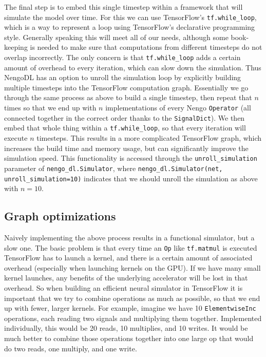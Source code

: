 \documentclass{article}
\begin{document}
The final step is to embed this single timestep within a framework that will simulate the model over time.  For this we can use TensorFlow's \texttt{tf.while\_loop}, which is a way to represent a loop using TensorFlow's declarative programming style.  Generally speaking this will meet all of our needs, although some book-keeping is needed to make sure that computations from different timesteps do not overlap incorrectly.  The only concern is that \texttt{tf.while\_loop} adds a certain amount of overhead to every iteration, which can slow down the simulation.  Thus NengoDL has an option to unroll the simulation loop by explicitly building multiple timesteps into the TensorFlow computation graph.  Essentially we go through the same process as above to build a single timestep, then repeat that $n$ times so that we end up with $n$ implementations of every Nengo \texttt{Operator} (all connected together in the correct order thanks to the \texttt{SignalDict}).  We then embed that whole thing within a \texttt{tf.while\_loop}, so that every iteration will execute $n$ timesteps.  This results in a more complicated TensorFlow graph, which increases the build time and memory usage, but can significantly improve the simulation speed.  This functionality is accessed through the \texttt{unroll\_simulation} parameter of \texttt{nengo\_dl.Simulator}, where \texttt{nengo\_dl.Simulator(net, unroll\_simulation=10)} indicates that we should unroll the simulation as above with $n=10$.

\subsection{Graph optimizations}
\label{sec:graphoptimizations}

Naively implementing the above process results in a functional simulator, but a slow one.  The basic problem is that every time an \texttt{Op} like \texttt{tf.matmul} is executed TensorFlow has to launch a kernel, and there is a certain amount of associated overhead (especially when launching kernels on the GPU).  If we have many small kernel launches, any benefits of the underlying accelerator will be lost in that overhead.  So when building an efficient neural simulator in TensorFlow it is important that we try to combine operations as much as possible, so that we end up with fewer, larger kernels.  For example, imagine we have 10 \texttt{ElementwiseInc} operations, each reading two signals and multiplying them together.  Implemented individually, this would be 20 reads, 10 multiplies, and 10 writes.  It would be much better to combine those operations together into one large op that would do two reads, one multiply, and one write.
\end{document}
